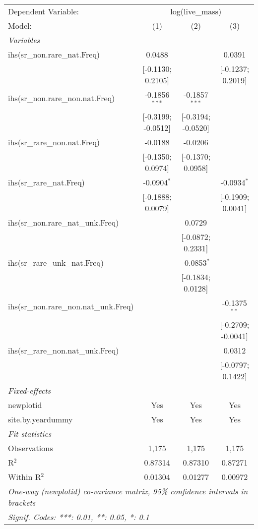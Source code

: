 \begin{tabular}{lccc}
\tabularnewline\midrule\midrule
Dependent Variable:&\multicolumn{3}{c}{log(live\_mass)}\\
Model:&(1) & (2) & (3)\\
\midrule \emph{Variables}&   &   &  \\
ihs(sr\_non.rare\_nat.Freq)&0.0488 &    & 0.0391\\
  &[-0.1130; 0.2105] &    & [-0.1237; 0.2019]\\
ihs(sr\_non.rare\_non.nat.Freq)&-0.1856$^{***}$ & -0.1857$^{***}$ &   \\
  &[-0.3199; -0.0512] & [-0.3194; -0.0520] &   \\
ihs(sr\_rare\_non.nat.Freq)&-0.0188 & -0.0206 &   \\
  &[-0.1350; 0.0974] & [-0.1370; 0.0958] &   \\
ihs(sr\_rare\_nat.Freq)&-0.0904$^{*}$ &    & -0.0934$^{*}$\\
  &[-0.1888; 0.0079] &    & [-0.1909; 0.0041]\\
ihs(sr\_non.rare\_nat\_unk.Freq)&   & 0.0729 &   \\
  &   & [-0.0872; 0.2331] &   \\
ihs(sr\_rare\_unk\_nat.Freq)&   & -0.0853$^{*}$ &   \\
  &   & [-0.1834; 0.0128] &   \\
ihs(sr\_non.rare\_non.nat\_unk.Freq)&   &    & -0.1375$^{**}$\\
  &   &    & [-0.2709; -0.0041]\\
ihs(sr\_rare\_non.nat\_unk.Freq)&   &    & 0.0312\\
  &   &    & [-0.0797; 0.1422]\\
\midrule \emph{Fixed-effects}&   &   &  \\
newplotid & Yes & Yes & Yes\\
site.by.yeardummy & Yes & Yes & Yes\\
\midrule \emph{Fit statistics}&  & & \\
Observations & 1,175&1,175&1,175\\
R$^2$ & 0.87314&0.87310&0.87271\\
Within R$^2$ & 0.01304&0.01277&0.00972\\
\midrule\midrule\multicolumn{4}{l}{\emph{One-way (newplotid) co-variance matrix, 95\% confidence intervals in brackets}}\\
\multicolumn{4}{l}{\emph{Signif. Codes: ***: 0.01, **: 0.05, *: 0.1}}\\
\end{tabular}


